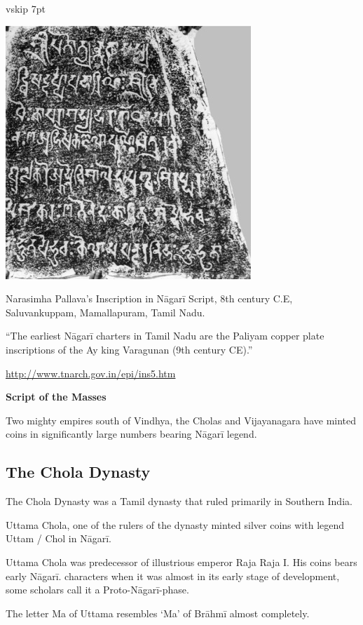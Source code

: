 vskip 7pt

\centerline{\includegraphics[scale=0.65]{"images/article-06/art06-fig07.jpg"}}

Narasimha Pallava’s Inscription in Nāgarī Script, 8th century C.E, Saluvankuppam, Mamallapuram, Tamil Nadu.

“The earliest Nāgarī charters in Tamil Nadu are the Paliyam copper plate inscriptions of the Ay king Varagunan (9th century CE).”

\url{http://www.tnarch.gov.in/epi/ins5.htm}

\textbf{Script of the Masses}

Two mighty empires south of Vindhya, the Cholas and Vijayanagara have minted coins in significantly large numbers bearing Nāgarī legend.


\subsection*{The Chola Dynasty}

The Chola Dynasty was a Tamil dynasty that ruled primarily in Southern India.

Uttama Chola, one of the rulers of the dynasty minted silver coins with legend Uttam / Chol in Nāgarī.

Uttama Chola was predecessor of illustrious emperor Raja Raja I. His coins bears early Nāgarī. characters when it was almost in its early stage of development, some scholars call it a Proto-Nāgarī-phase.

The letter Ma of Uttama resembles ‘Ma’ of Brāhmī almost completely.

